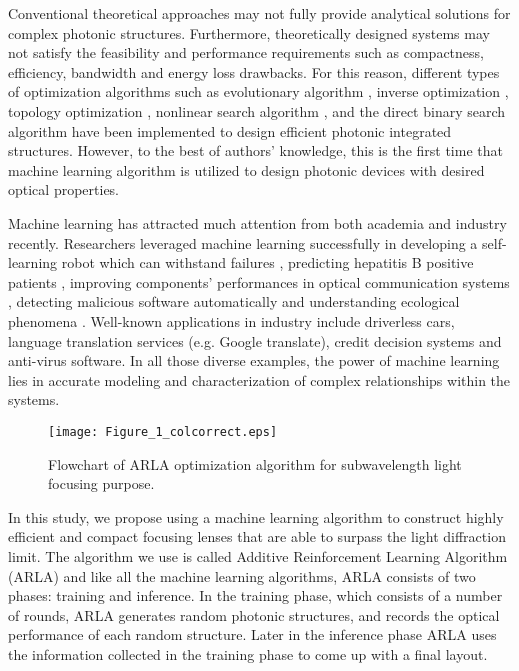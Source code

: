 \documentclass[9pt,twocolumn,twoside]{article}
\begin{document}
  Conventional theoretical approaches may not fully provide analytical solutions for complex photonic structures. Furthermore, theoretically designed systems may not satisfy the feasibility and performance requirements such as compactness, efficiency, bandwidth and energy loss drawbacks.  For this reason, different types of optimization algorithms such as evolutionary algorithm \cite{bor2016differential}, inverse optimization \cite{Lu2013}, topology optimization \cite{Borel2004}, nonlinear search algorithm \cite{Shen2014}, and the direct binary search algorithm \cite{Shen2015} have been implemented to design efficient photonic integrated structures. However, to the best of authors’ knowledge, this is the first time that machine learning algorithm is utilized to design photonic devices with desired optical properties. 
  
  Machine learning has attracted much attention from both academia and industry recently. Researchers leveraged machine learning successfully in developing a self-learning robot which can withstand failures \cite{Cully2015a}, predicting hepatitis B positive patients \cite{Ye2003a}, improving components' performances in optical communication systems \cite{Zibar2016}, detecting malicious software automatically \cite{Rieck2011a} and understanding ecological phenomena \cite{Olden2008a}. Well-known applications in industry include driverless cars, language translation services (e.g. Google translate), credit decision systems and anti-virus software. In all those diverse examples, the power of machine learning lies in accurate modeling and characterization of complex relationships within the systems.
  
  \begin{figure*}[!t]
    \centering
    \texttt{[image: Figure\_1\_colcorrect.eps]}
    \caption{Flowchart of ARLA optimization algorithm for subwavelength light focusing purpose.}
    \label{flowchart}
  \end{figure*}
  
  In this study, we propose using a machine learning algorithm to construct highly efficient and compact focusing lenses that are able to surpass the light diffraction limit. The algorithm we use is called Additive Reinforcement Learning Algorithm (ARLA) \cite{Cagri2017} and like all the machine learning algorithms, ARLA consists of two phases: training and inference. In the training phase, which consists of a number of rounds, ARLA generates random photonic structures, and records the optical performance of each random structure. Later in the inference phase ARLA uses the information collected in the training phase to come up with a final layout. 
  
\end{document}
